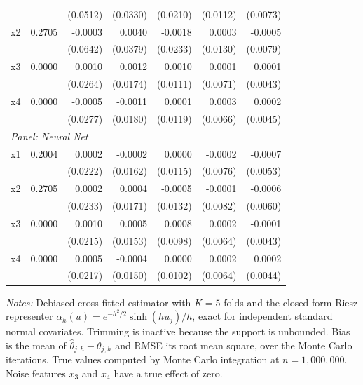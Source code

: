 \begin{table}[htbp]
\begin{threeparttable}
\begin{tabular}{lrrrrrr}
 &  & (0.0512) & (0.0330) & (0.0210) & (0.0112) & (0.0073) \\
\quad x2 & 0.2705 & -0.0003 & 0.0040 & -0.0018 & 0.0003 & -0.0005 \\
 &  & (0.0642) & (0.0379) & (0.0233) & (0.0130) & (0.0079) \\
\quad x3 & 0.0000 & 0.0010 & 0.0012 & 0.0010 & 0.0001 & 0.0001 \\
 &  & (0.0264) & (0.0174) & (0.0111) & (0.0071) & (0.0043) \\
\quad x4 & 0.0000 & -0.0005 & -0.0011 & 0.0001 & 0.0003 & 0.0002 \\
 &  & (0.0277) & (0.0180) & (0.0119) & (0.0066) & (0.0045) \\
\midrule
\multicolumn{7}{l}{\textit{Panel: Neural Net}} \\
\quad x1 & 0.2004 & 0.0002 & -0.0002 & 0.0000 & -0.0002 & -0.0007 \\
 &  & (0.0222) & (0.0162) & (0.0115) & (0.0076) & (0.0053) \\
\quad x2 & 0.2705 & 0.0002 & 0.0004 & -0.0005 & -0.0001 & -0.0006 \\
 &  & (0.0233) & (0.0171) & (0.0132) & (0.0082) & (0.0060) \\
\quad x3 & 0.0000 & 0.0010 & 0.0005 & 0.0008 & 0.0002 & -0.0001 \\
 &  & (0.0215) & (0.0153) & (0.0098) & (0.0064) & (0.0043) \\
\quad x4 & 0.0000 & 0.0005 & -0.0004 & 0.0000 & 0.0002 & 0.0002 \\
 &  & (0.0217) & (0.0150) & (0.0102) & (0.0064) & (0.0044) \\
\bottomrule
\end{tabular}
\begin{tablenotes}
\footnotesize
\item \textit{Notes:} Debiased cross-fitted estimator with $K=5$ folds and the closed-form Riesz representer $\alpha_h(u) = e^{-h^2/2}\sinh(h u_j)/h$, exact for independent standard normal covariates. Trimming is inactive because the support is unbounded. Bias is the mean of $\hat{\theta}_{j,h} - \theta_{j,h}$ and RMSE its root mean square, over the Monte Carlo iterations. True values computed by Monte Carlo integration at $n=1{,}000{,}000$. Noise features $x_3$ and $x_4$ have a true effect of zero.
\end{tablenotes}
\end{threeparttable}
\end{table}